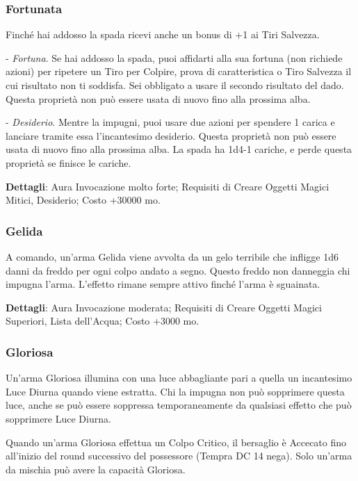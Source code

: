 \begin{multicols}{2}
\subsubsection*{Fortunata}

Finché hai addosso la spada ricevi anche un bonus di +1 ai Tiri Salvezza.

- \textit{Fortuna}. Se hai addosso la spada, puoi affidarti alla sua fortuna (non richiede azioni) per ripetere un Tiro per Colpire, prova di caratteristica o Tiro Salvezza il cui risultato non ti soddisfa. Sei obbligato a usare il secondo risultato del dado. Questa proprietà non può essere usata di nuovo fino alla prossima alba.

- \textit{Desiderio}. Mentre la impugni, puoi usare due azioni per spendere 1 carica e lanciare tramite essa l'incantesimo desiderio. Questa proprietà non può essere usata di nuovo fino alla prossima alba. La spada ha 1d4-1 cariche, e perde questa proprietà se finisce le cariche.

\textbf{Dettagli}: Aura Invocazione molto forte; Requisiti di Creare Oggetti Magici Mitici, Desiderio; Costo +30000 mo.

\subsubsection*{Gelida}

A comando, un'arma Gelida viene avvolta da un gelo terribile che infligge 1d6 danni da freddo per ogni colpo andato a segno. Questo freddo non danneggia chi impugna l'arma. L'effetto rimane sempre attivo finché l'arma è sguainata.

\textbf{Dettagli}: Aura Invocazione moderata; Requisiti di Creare Oggetti Magici Superiori, Lista dell'Acqua; Costo +3000 mo.

\subsubsection*{Gloriosa}

Un'arma Gloriosa illumina con una luce abbagliante pari a quella un incantesimo Luce Diurna quando viene estratta. Chi la impugna non può sopprimere questa luce, anche se può essere soppressa temporaneamente da qualsiasi effetto che può sopprimere Luce Diurna.

Quando un'arma Gloriosa effettua un Colpo Critico, il bersaglio è Accecato fino all'inizio del round successivo del possessore (Tempra DC 14 nega). Solo un'arma da mischia può avere la capacità Gloriosa.


\end{multicols}
